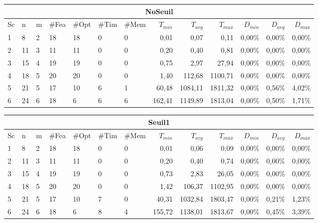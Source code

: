 \begin{table}[h]
    \centering
    \begin{tabular}{|l|l|l|l|l|l|l|r|r|r|r|r|r|}
    	\hline
    	\multicolumn{13}{|c|}{NoSeuil}\\ \hline
Sc &	n	&m	&\#Fea	&\#Opt	&\#Tim &\#Mem	&$T_{min}$ & $T_{avg}$	& $T_{max}$ & $D_{min}$ & $D_{avg}$	& $D_{max}$ \\ \hline
1&	8 &	2&	18&	18&	0&	0&	0,01&	0,07&	0,11	&0,00\%&	0,00\%&	0,00\%    \\ \hline
2&	11&	3&	11&	11&	0&	0&	0,20&	0,40&	0,81	&0,00\%&	0,00\%&	0,00\%     \\ \hline
3&	15&	4&	19&	19&	0&	0&	0,75&	2,97&	27,94	&0,00\%&	0,00\%&	0,00\%  \\ \hline
4 &	18	&5	&20	    &20	    &0	    & 0	        &1,40	&    112,68	&1100,71	&0,00\%&0,00\%&0,00\% \\ \hline
5 &	21	&5	&17	    &10	    &6	    & 1	        &60,48	&1084,11	&1811,32	&0,00\%&0,56\%&4,02\% \\ \hline
6 &	24	&6	&18	    &6	    &6	    & 6	        &162,41	&1149,89	&1813,04	&0,00\%&0,50\%&1,71\% \\ \hline
    \end{tabular}
    \label{tab_cut2_tab2}
\medskip \par
    \begin{tabular}{|l|l|l|l|l|l|l|r|r|r|r|r|r|}
    	\hline
    	\multicolumn{13}{|c|}{Seuil1}\\ \hline
Sc &	n	&m	&\#Fea	&\#Opt	&\#Tim &\#Mem	&$T_{min}$ & $T_{avg}$	& $T_{max}$ & $D_{min}$ & $D_{avg}$	& $D_{max}$ \\ \hline
1&	8 &	2&	18&	18&	0&	0&	0,01&	0,06&	0,09	&0,00\%&	0,00\%&	0,00\%    \\ \hline
2&	11&	3&	11&	11&	0&	0&	0,20&	0,40&	0,74	&0,00\%&	0,00\%&	0,00\%     \\ \hline
3&	15&	4&	19&	19&	0&	0&	0,73&	2,83&	26,05	&0,00\%&	0,00\%&	0,00\%  \\ \hline
4&	18&	5&	20&	20&	0&	0&	1,42	&106,37	&1102,95	&0,00\% &  0,00\%  &  0,00\%     \\ \hline
5&	21&	5&	17&	10&	7&	0&	40,31	&1032,84&	1803,47	&0,00\%	&0,21\%	&1,23\%     \\ \hline
6&	24&	6&	18&	6 &	8&	4&	155,72	&1138,01&	1813,67	&0,00\%	&0,45\%	&3,39\%     \\ \hline
    \end{tabular}
    \label{tab_cut2_s1_tab2}

\end{table}
